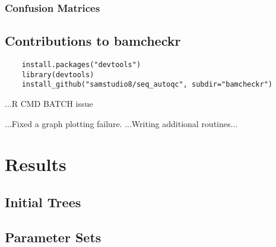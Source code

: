 \subsubsection{Confusion Matrices}

\subsection{Contributions to bamcheckr}
\begin{verbatim}
    install.packages("devtools")
    library(devtools)
    install_github("samstudio8/seq_autoqc", subdir="bamcheckr")
\end{verbatim}

...R CMD BATCH issue

...Fixed a graph plotting failure.
...Writing additional routines...

\section{Results}
\subsection{Initial Trees}
\subsection{Parameter Sets}
